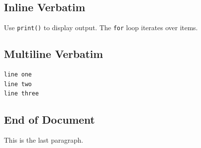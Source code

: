 \documentclass{article}
\begin{document}
\subsection*{Inline Verbatim}

Use \texttt{print()} to display output.
The \texttt{for} loop iterates over items.

\subsection*{Multiline Verbatim}

\begin{verbatim}
line one
line two
line three
\end{verbatim}

\subsection*{End of Document}

This is the last paragraph.

\end{document}
